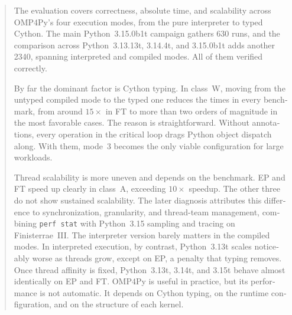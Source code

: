 \begin{abstract}
\begin{otherlanguage}{english}
The evaluation covers correctness, absolute time, and scalability across
OMP4Py's four execution modes, from the pure interpreter to typed Cython. The
main Python~3.15.0b1t campaign gathers 630 runs, and the comparison across
Python~3.13.13t, 3.14.4t, and 3.15.0b1t adds another 2340, spanning interpreted
and compiled modes. All of them verified correctly.

By far the dominant factor is Cython typing. In class~W, moving from the untyped
compiled mode to the typed one reduces the times in every benchmark, from around
$15\times$ in FT to more than two orders of magnitude in the most favorable
cases. The reason is straightforward. Without annotations, every operation in the
critical loop drags Python object dispatch along. With them, mode~3 becomes the
only viable configuration for large workloads.

Thread scalability is more uneven and depends on the benchmark. EP and FT speed
up clearly in class~A, exceeding $10\times$ speedup. The other three do not show
sustained scalability. The later diagnosis attributes this difference to
synchronization, granularity, and thread-team management, combining
\texttt{perf stat} with Python~3.15 sampling and tracing on Finisterrae~III. The
interpreter version barely matters in the compiled modes. In interpreted
execution, by contrast, Python~3.13t scales noticeably worse as threads grow,
except on EP, a penalty that typing removes. Once thread affinity is fixed,
Python~3.13t, 3.14t, and 3.15t behave almost identically on EP and FT. OMP4Py is
useful in practice, but its performance is not automatic. It depends on Cython
typing, on the runtime configuration, and on the structure of each kernel.
\end{otherlanguage}

\vspace*{25pt}

\end{abstract}

